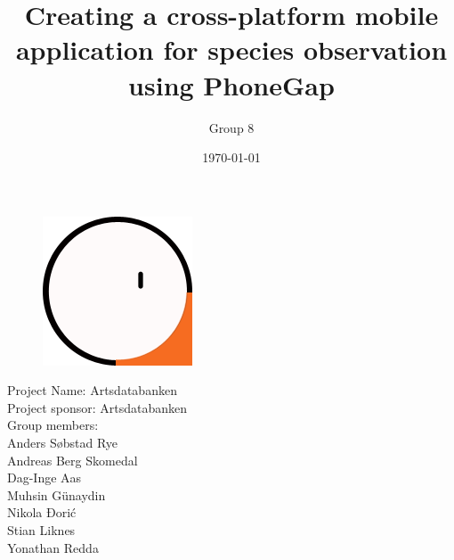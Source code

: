 \documentclass[a4paper]{article}
\begin{document}
  \title{Creating a cross-platform mobile application for species observation using PhoneGap}
  
  \begin{figure}
    \centering
        \includegraphics[scale=1.0]{Logo_.png}
  \end{figure}
    
	\author{Group 8}
	\date{\today}
	\maketitle
	\thispagestyle{empty}
	\pagebreak

	\pagestyle{empty}
	\begin{center}
		Project Name: Artsdatabanken \\
		Project sponsor: Artsdatabanken \\
    Group members: \\
    Anders Søbstad Rye\\
    Andreas Berg Skomedal\\
    Dag-Inge Aas\\
    Muhsin Günaydin\\
    Nikola Đorić\\
    Stian Liknes\\
    Yonathan Redda
	\end{center}
	\newpage

	\tableofcontents
	\listoffigures
	\listoftables

	\newpage
	\pagestyle{plain}
	\setcounter{page}{1}
  

  \newpage
	

  \newpage
  

	\newpage
	

	\newpage
	

	\newpage

	

	\newpage
	

	\newpage
	

	\newpage
	
	
	\newpage
	

	\newpage	
	
	\newpage
	
	
	
	\newpage
	\clearpage
		\nocite{*}
		
		
\end{document}
